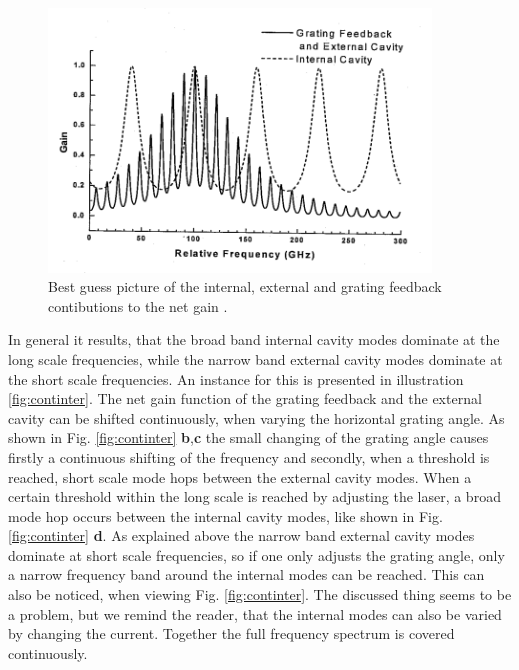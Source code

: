 \begin{figure}
  \centering
  \includegraphics[height=7cm]{Ordnername/bestguess.png}
  \caption{Best guess picture of the internal, external and grating feedback contibutions to the net gain \cite{manual}.}
  \label{fig:bestguess}
\end{figure}

In general it results, that the broad band internal cavity modes dominate at the long scale frequencies, while the narrow band external cavity modes
dominate at the short scale frequencies. An instance for this is presented in illustration \ref{fig:continter}.
The net gain function of the grating feedback and the external cavity can be shifted continuously, when varying the
horizontal grating angle. As shown in Fig. \ref{fig:continter} \textbf{b},\textbf{c} the small changing
of the grating angle causes firstly a continuous shifting of the frequency and secondly, when a threshold is reached, short scale
mode hops between the external cavity modes. When a certain threshold within the long scale is reached by adjusting the laser, a broad mode hop occurs
between the internal cavity modes, like shown in Fig. \ref{fig:continter} \textbf{d}.
As explained above the narrow band external cavity modes dominate at short scale frequencies, so if one only adjusts the grating angle, only
a narrow frequency band around the internal modes can be reached. This can also be noticed, when viewing Fig. \ref{fig:continter}.
The discussed thing seems to be a problem, but we remind the reader, that the internal modes can also be varied by changing the current.
Together the full frequency spectrum is covered continuously.

